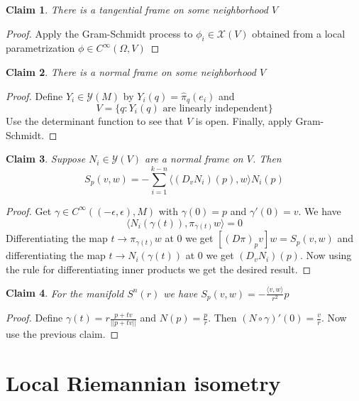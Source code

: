 \documentclass{article}
\newtheorem{claim}{Claim}
\begin{document}
\begin{claim}
  There is a tangential frame on some neighborhood $V$
\end{claim}

\begin{proof}
  Apply the Gram-Schmidt process to $\phi_i \in \mathcal{X}(V)$ obtained from a local parametrization $\phi \in C^\infty(\Omega,V)$
\end{proof}

\begin{claim}
  There is a normal frame on some neighborhood $V$
\end{claim}

\begin{proof}
  Define $Y_i \in \mathcal{Y}(M)$ by $Y_i(q)=\hat{\pi}_q(e_i)$ and \[V=\{q:Y_i(q) \text{ are linearly independent}\}\]
  Use the determinant function to see that $V$ is open. Finally, apply Gram-Schmidt.
\end{proof}

\begin{claim}
  Suppose $N_i \in \mathcal{Y}(V)$ are a normal frame on $V$. 
   Then \[S_p(v,w)=-\sum_{i=1}^{k-n}\langle (D_vN_i)(p),w \rangle N_i(p)\]
\end{claim}

\begin{proof}
  Get $\gamma \in C^\infty((-\epsilon,\epsilon),M)$ with $\gamma(0)=p$ and $\gamma'(0)=v$. 
  We have \[\langle N_i(\gamma(t)), \pi_{\gamma(t)}w \rangle =0\]
  Differentiating the map $t \to \pi_{\gamma(t)}w$ at $0$ we get $[(D\pi)_pv]w=S_p(v,w)$ 
  and differentiating the map $t \to N_i(\gamma(t))$ at $0$ we get $(D_vN_i)(p)$. Now using 
  the rule for differentiating inner products we get the desired result.
\end{proof}

\begin{claim}
  For the manifold $S^n(r)$ we have $S_p(v,w)=-\frac{\langle v , w \rangle}{r^2}p$
\end{claim}

\begin{proof}
  Define $\gamma(t)=r\frac{p+tv}{||p+tv||}$ and $N(p)=\frac{p}{r}$. Then $(N \circ \gamma)'(0)=\frac{v}{r}$. Now use the previous claim.
\end{proof}

\section{Local Riemannian isometry}
\end{document}
